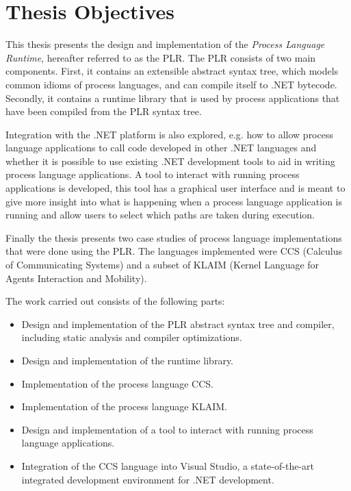 \section{Thesis Objectives}

	This thesis presents the design and implementation of the \textit{Process 
	Language Runtime}, hereafter referred to as the PLR. The PLR consists of two 
	main components. First, it contains an extensible abstract syntax tree, 
	which models common idioms of process languages, and can compile itself to 
	.NET bytecode. Secondly, it contains a runtime library that is used by 
	process applications that have been compiled from the PLR syntax tree. 

	Integration with the .NET platform is also explored, e.g. how to allow 
	process language applications to call code developed in other .NET languages 
	and whether it is possible to use existing .NET development tools to aid in 
	writing process language applications. A tool to interact with running 
	process applications is developed, this tool has a graphical user interface
	and is meant to give more insight into what is happening when a process language
	application is running and allow users to select which paths are taken during
	execution.

	Finally the thesis presents two case studies of process language 
	implementations that were done using the PLR. The languages implemented were 
	CCS (Calculus of Communicating Systems) and a subset of KLAIM (Kernel 
	Language for Agents Interaction and Mobility).

	The work carried out consists of the following parts:

	\begin{itemize}
  	\item Design and implementation of the PLR abstract syntax tree and 
  				compiler, including static analysis and compiler optimizations.
  	\item Design and implementation of the runtime library.
  	\item Implementation of the process language CCS.
  	\item Implementation of the process language KLAIM.
  	\item Design and implementation of a tool to interact with running process language applications.
  	\item Integration of the CCS language into Visual Studio, a 
  				state-of-the-art integrated development environment for .NET 
  				development.
	\end{itemize}


